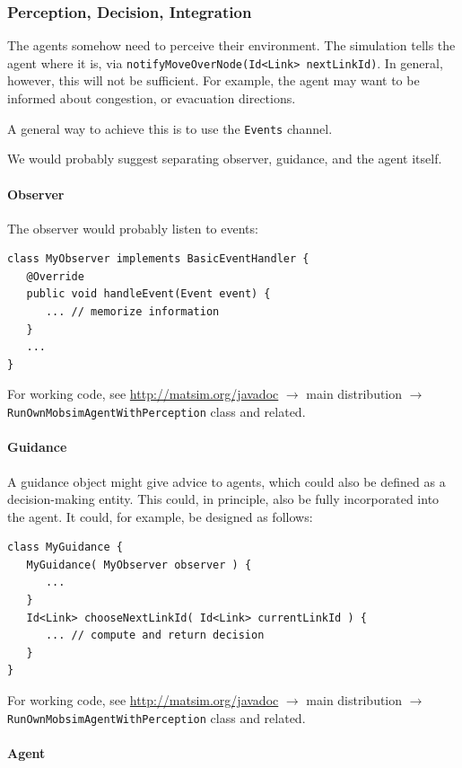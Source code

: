 \subsubsection{Perception, Decision, Integration}
The agents somehow need to perceive their environment. The simulation tells the agent where it is, via \lstinline|notifyMoveOverNode(Id<Link> nextLinkId)|. In general, however, this will not be sufficient. For example, the agent may want to be informed about congestion, or evacuation directions.

A general way to achieve this is to use the \lstinline$Events$ channel.

We would probably suggest separating observer, guidance, and the agent itself.

\paragraph{Observer}

The observer would probably listen to events:
\begin{lstlisting}
class MyObserver implements BasicEventHandler {
   @Override
   public void handleEvent(Event event) {
      ... // memorize information
   }
   ...
}
\end{lstlisting}
For working code, see \url{http://matsim.org/javadoc} $\to$ main distribution $\to$ \lstinline{RunOwnMobsimAgentWithPerception} class and related.

\paragraph{Guidance}

A guidance object might give advice to agents, which could also be defined as a decision-making entity. This could, in principle, also be fully incorporated into the agent. It could, for example, be designed as follows:
\begin{lstlisting}
class MyGuidance {
   MyGuidance( MyObserver observer ) {
      ...
   }
   Id<Link> chooseNextLinkId( Id<Link> currentLinkId ) {
      ... // compute and return decision
   }
}
\end{lstlisting}
For working code, see \url{http://matsim.org/javadoc} $\to$ main distribution $\to$ \lstinline{RunOwnMobsimAgentWithPerception} class and related.

\paragraph{Agent}

